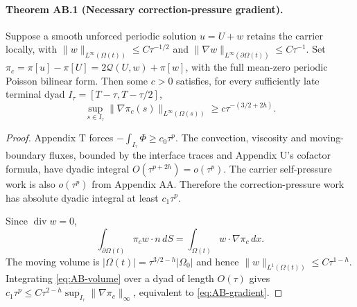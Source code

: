 \paragraph{Theorem AB.1 (Necessary correction-pressure gradient).}
Suppose a smooth unforced periodic solution $u=U+w$ retains the carrier locally, with $\|w\|_{L^\infty(\Omega(t))}\le C\tau^{-1/2}$ and $\|\nabla w\|_{L^\infty(\partial\Omega(t))}\le C\tau^{-1}$. Set $\pi_c=\pi[u]-\pi[U]=2\mathcal Q(U,w)+\pi[w]$, with the full mean-zero periodic Poisson bilinear form. Then some $c>0$ satisfies, for every sufficiently late terminal dyad $I_\tau=[T-\tau,T-\tau/2]$,
\begin{equation}\label{eq:AB-gradient}
\boxed{\sup_{s\in I_\tau}\|\nabla\pi_c(s)\|_{L^\infty(\Omega(s))}
\ge c\tau^{-(3/2+2h)}.}
\end{equation}
\begin{proof}
Appendix T forces $-\int_{I_\tau}\Phi\ge c_0\tau^p$. The convection, viscosity and moving-boundary fluxes, bounded by the interface traces and Appendix U's cofactor formula, have dyadic integral $O(\tau^{p+2h})=o(\tau^p)$. The carrier self-pressure work is also $o(\tau^p)$ from Appendix AA. Therefore the correction-pressure work has absolute dyadic integral at least $c_1\tau^p$.

Since $\operatorname{div}w=0$,
\begin{equation}\label{eq:AB-volume}
\int_{\partial\Omega(t)}\pi_c w\cdot n\,dS
=\int_{\Omega(t)}w\cdot\nabla\pi_c\,dx.
\end{equation}
The moving volume is $|\Omega(t)|=\tau^{3/2-h}|\Omega_0|$ and hence
$\|w\|_{L^1(\Omega(t))}\le C\tau^{1-h}$. Integrating
\eqref{eq:AB-volume} over a dyad of length $O(\tau)$ gives
$c_1\tau^p\le C\tau^{2-h}\sup_{I_\tau}\|\nabla\pi_c\|_\infty$,
equivalent to \eqref{eq:AB-gradient}.
\end{proof}

